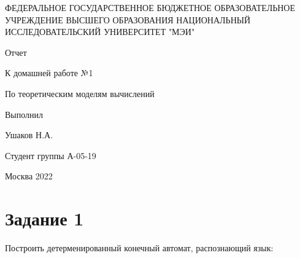 \documentclass[a4paper, 12pt] {article} %
\begin{document}
\thispagestyle{empty}

\begin{center}
	ФЕДЕРАЛЬНОЕ ГОСУДАРСТВЕННОЕ БЮДЖЕТНОЕ ОБРАЗОВАТЕЛЬНОЕ УЧРЕЖДЕНИЕ ВЫСШЕГО ОБРАЗОВАНИЯ НАЦИОНАЛЬНЫЙ ИССЛЕДОВАТЕЛЬСКИЙ УНИВЕРСИТЕТ "МЭИ"
\end{center}

\vspace{7cm}

\begin{center}
    \Huge Отчет

	\Large К домашней работе №1
	
	\Large По теоретическим моделям вычислений
\end{center}

\vspace{3cm}

\begin{flushright}
	Выполнил
	
	Ушаков Н.А. 
	
	Студент группы А-05-19
\end{flushright}

\vfill
\begin{center}
	Москва 2022
\end{center}

\newpage

\section*{Задание 1} 
Построить детерменированный конечный автомат, распознающий язык:
\end{document}
